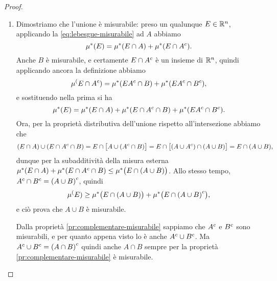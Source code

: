 \begin{proof}
	\begin{enumerate}
		\item Dimostriamo che l'unione è misurabile: preso un qualunque $E\in\mathbb{R}^n$, applicando la \eqref{eq:lebesgue-misurabile} ad $A$ abbiamo
			\begin{equation}
				\mu^*(E)=\mu^*(E\cap A)+\mu^*(E\cap{A}^c).
			\end{equation}
			Anche $B$ è misurabile, e certamente $E\cap{A}^c$ è un insieme di $\mathbb{R}^n$, quindi applicando ancora la definizione abbiamo
			\begin{equation}
				\mu^(E\cap{A}^c)=\mu^*(E{A}^c\cap B)+\mu^*(E{A}^c\cap{B}^c),
			\end{equation}
			e sostituendo nella prima si ha
			\begin{equation}
				\mu^*(E)=\mu^*(E\cap A)+\mu^*(E\cap{A}^c\cap B)+\mu^*(E{A}^c\cap{B}^c).
			\end{equation}
			Ora, per la proprietà distributiva dell'unione rispetto all'intersezione abbiamo che
			\begin{equation}
				(E\cap A)\cup(E\cap{A}^c\cap B)=E\cap\big[A\cup({A}^c\cap B)\big]=E\cap\big[(A\cup{A}^c)\cap(A\cup B)\big]=E\cap(A\cup B),
			\end{equation}
			dunque per la subadditività della misura esterna $\mu^*(E\cap A)+\mu^*(E\cap{A}^c\cap B)\leq\mu^*\big(E\cap(A\cup B)\big)$.
			Allo stesso tempo, ${A}^c\cap{B}^c={(A\cup B)}^c$, quindi
			\begin{equation}
				\mu^(E)\geq\mu^*\big(E\cap(A\cup B)\big)+\mu^*\big(E\cap{(A\cup B)}^c\big),
			\end{equation}
			e ciò prova che $A\cup B$ è misurabile.
			
			Dalla proprietà \ref{pr:complementare-misurabile} sappiamo che ${A}^c$ e ${B}^c$ sono misurabili, e per quanto appena visto lo è anche ${A}^c\cup{B}^c$.
			Ma ${A}^c\cup{B}^c={(A\cap B)}^c$ quindi anche $A\cap B$ sempre per la proprietà \ref{pr:complementare-misurabile} è misurabile.


\end{enumerate}
\end{proof}
